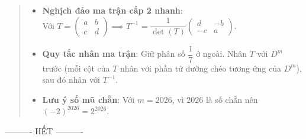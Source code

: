\documentclass[12pt,a4paper]{article}
\begin{document}
\begin{quote}
\small
\noindent{}\par\vspace{3pt}
\begin{itemize}[noitemsep,topsep=2pt]
\item \textbf{Nghịch đảo ma trận cấp 2 nhanh}:\\
Với $T = \begin{pmatrix} a & b \\ c & d \end{pmatrix} \implies T^{-1} = \dfrac{1}{\det(T)}\begin{pmatrix} d & -b \\ -c & a \end{pmatrix}$.
\item \textbf{Quy tắc nhân ma trận}: Giữ phân số $\dfrac{1}{7}$ ở ngoài. Nhân $T$ với $D^m$ trước (mỗi cột của $T$ nhân với phần tử đường chéo tương ứng của $D^m$), sau đó nhân với $T^{-1}$.
\item \textbf{Lưu ý số mũ chẵn}: Với $m = 2026$, vì 2026 là số chẵn nên $(-2)^{2026} = 2^{2026}$.
\end{itemize}
\end{quote}

\vspace{0.3cm}


\vspace{0.5cm}
\begin{center}
\vspace{0.3cm}
---------- HẾT ----------
\end{center}
\end{document}
